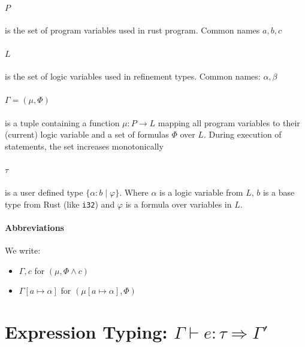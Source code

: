 \documentclass{book}
\theoremstyle{definition}
\begin{document}
\paragraph*{$P$} is the set of program variables used in rust program. Common names $a, b, c$
\paragraph*{$L$} is the set of logic variables used in refinement types. Common names: $\alpha, \beta$

\paragraph*{$\Gamma = (\mu, \Phi)$} is a tuple containing a function $\mu: P \to L$ mapping all program variables to their (current) logic variable and a set of formulas $\Phi$ over $L$. During execution of statements, the set increases monotonically

\paragraph*{$\tau$} is a user defined type $\{ \alpha : b \mid \varphi\}$. Where $\alpha$ is a logic variable from $L$, $b$ is a base type from Rust (like \texttt{i32}) and $\varphi$ is a formula over variables in $L$.

\paragraph*{Abbreviations}
We write:
\begin{itemize}
  \item  $\Gamma, c$ for $(\mu, \Phi \wedge c)$
  \item $\Gamma[a \mapsto \alpha]$ for $(\mu[a \mapsto \alpha], \Phi)$
\end{itemize}


\section{Expression Typing: $\Gamma \vdash e : \tau \Rightarrow \Gamma'$}
\end{document}
